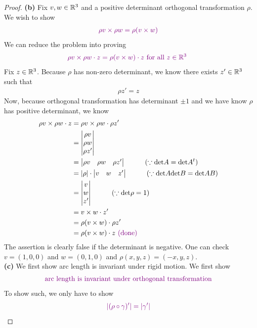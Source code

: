 \documentclass{report}
\begin{document}
\begin{proof}
\textbf{(b)}
Fix $v,w \in\mathbb{R}^3$ and a positive determinant orthogonal transformation $\rho$. We wish to show 
\begin{align*}
\textcolor{violet}{\rho v \times \rho w = \rho(v \times w)}
\end{align*}
We can reduce the problem into proving 
\begin{align*}
\textcolor{violet}{\rho v \times \rho w \cdot z = \rho (v \times w) \cdot z\text{ for all $z \in\mathbb{R}^3$ }}
\end{align*}
Fix $z \in\mathbb{R}^3$. Because $\rho$ has non-zero determinant, we know there exists $z' \in\mathbb{R}^3$ such that 
\begin{align*}
\rho z'=z
\end{align*}
Now, because orthogonal transformation has determinant  $\pm 1$ and we have know  $\rho$ has positive determinant, we know
\begin{align*}
\rho v \times \rho w \cdot z&=\rho v \times \rho w \cdot \rho z'\\
&=\begin{vmatrix} 
\rho v\\
\rho w\\
\rho z'\end{vmatrix} \\
&= \begin{vmatrix} 
  \rho v & \rho w & \rho z'
\end{vmatrix}\hspace{1cm}(\because \text{det}A=\text{det}A^t)\\
&=\left|\rho\right| \cdot \begin{vmatrix} 
  v & w & z'
\end{vmatrix}\hspace{1cm}(\because \text{det}A\text{det}B=\text{det}AB)\\
&=\begin{vmatrix} 
v \\
w \\
z'
\end{vmatrix}\hspace{1cm}(\because \text{det}\rho=1)\\
&=v \times w \cdot z'\\
&=\rho (v \times w) \cdot \rho z'\\
&= \rho (v \times w)\cdot z \textcolor{violet}{\text{ (done) }}
\end{align*}
The assertion is clearly false if the determinant is negative. One can check $v=(1,0,0)$ and $w=(0,1,0)$ and $\rho(x,y,z)=(-x,y,z)$. \\

\textbf{(c)}
We first show arc length is invariant under rigid motion. We first show 
\begin{align*}
\textcolor{violet}{\text{ arc length is invariant under orthogonal transformation }}
\end{align*}
To show such, we only have to show 
\begin{align*}
  \textcolor{violet}{\left|(\rho \circ \gamma )'\right|=\left|\gamma '\right|}
\end{align*}
\end{proof}
\end{document}
